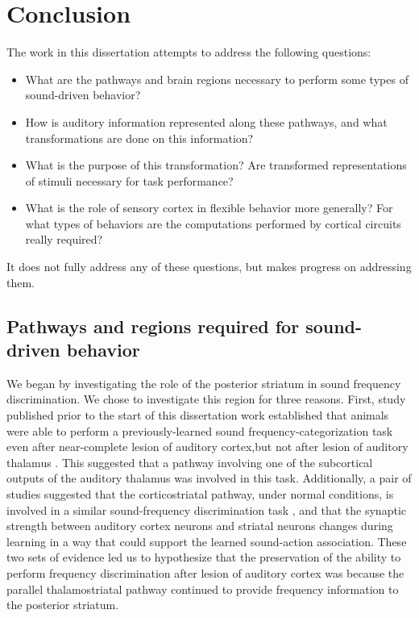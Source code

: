 \chapter{Conclusion}

The work in this dissertation attempts to address the following questions: 
\begin{itemize}
\item What are the pathways and brain regions necessary to perform some types of sound-driven behavior? 
\item How is auditory information represented along these pathways, and what transformations are done on this information?
\item What is the purpose of this transformation? Are transformed representations of stimuli necessary for task performance? 
\item What is the role of sensory cortex in flexible behavior more generally? For what types of behaviors are the computations performed by cortical circuits really required?
\end{itemize}

It does not fully address any of these questions, but makes progress on addressing them.

\section{Pathways and regions required for sound-driven behavior}
We began by investigating the role of the posterior striatum in sound frequency discrimination. 
%
We chose to investigate this region for three reasons. 
%
First, study published prior to the start of this dissertation work established that animals were able to perform a previously-learned sound frequency-categorization task even after near-complete lesion of auditory cortex,but not after lesion of auditory thalamus \citep{Gimenez2015}.
%
This suggested that a pathway involving one of the subcortical outputs of the auditory thalamus was involved in this task.
%
Additionally, a pair of studies suggested that the corticostriatal pathway, under normal conditions, is involved in a similar sound-frequency discrimination task \citep{Znamenskiy2013}, and that the synaptic strength between auditory cortex neurons and striatal neurons changes during learning in a way that could support the learned sound-action association. 
%
These two sets of evidence led us to hypothesize that the preservation of the ability to perform frequency discrimination after lesion of auditory cortex was because the parallel thalamostriatal pathway continued to provide frequency information to the posterior striatum.

